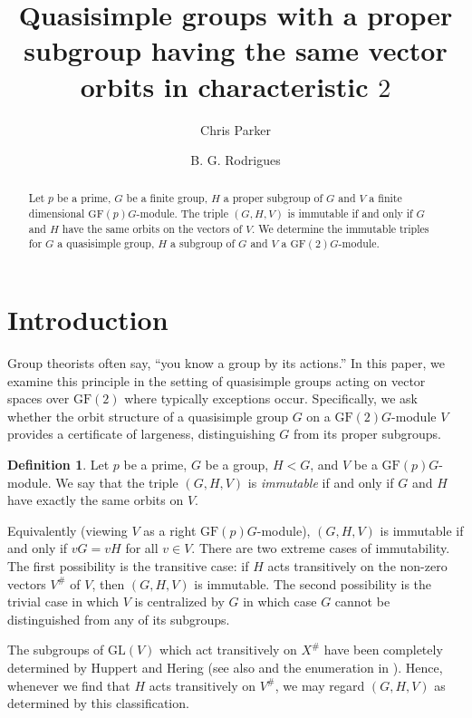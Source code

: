 \documentclass[12pt]{amsart}
\title[Quasisimple groups with a proper subgroup with the same vector orbits]
{Quasisimple groups with a proper subgroup having the same vector orbits in characteristic $2$}
\author{Chris Parker}
\author{B. G. Rodrigues}
\theoremstyle{remark}
\theoremstyle{notation}
\theoremstyle{definition}
\newtheorem{definition}[theorem]{Definition}
\newcommand{\GF}{\mathrm{GF}}
\newcommand{\GL}{\mathrm{GL}}
\newcommand{\0}{\emptyset}
\begin{document}
\maketitle

\begin{abstract}
Let  $p$ be a prime, $G$ be a finite group, $H$ a proper subgroup of $G$ and $V$ a finite dimensional $\GF(p)G$-module. The triple $(G,H,V)$ is immutable if and only if $G$ and $H$ have the same orbits on the vectors of $V$. We determine the immutable triples for $G$ a quasisimple group, $H$ a subgroup of $G$ and $V$ a $\GF(2)G$-module.
\end{abstract}

\section{Introduction}
Group theorists often say, ``you know a group by its actions.''
In this paper, we examine this principle in the setting of quasisimple groups acting on vector spaces over $\GF(2)$ where  typically exceptions occur.
Specifically, we ask whether the orbit structure of a quasisimple group $G$ on a $\GF(2)G$-module $V$ provides a certificate of largeness, distinguishing $G$ from its proper subgroups.

\begin{definition}\label{def:imm}
Let $p$ be a prime,  $ G $ be a group, $ H <G $, and $ V $ be a $ \GF(p)G $-module.
We say that the triple $ (G,H,V) $ is \emph{immutable} if and only if $ G $ and $ H $ have exactly the same orbits on $ V $.
\end{definition}

Equivalently (viewing $V$ as a right $ \GF(p)G $-module), $ (G,H,V) $ is immutable if and only if $ vG = vH $ for all $ v \in V $.  There are two extreme cases of immutability. The first possibility is the transitive case: if $ H $ acts transitively on the non-zero vectors $V ^\# $ of $V$, then $ (G,H,V) $ is immutable. The second possibility  is the trivial case in which $ V $ is centralized by $ G $ in which case $G$ cannot be distinguished from any of  its subgroups.


The  subgroups of $\GL(V)$ which act transitively on $X^\#$ have been completely determined by Huppert and Hering \cite{Huppert, Hering} (see also \cite[Section~7]{HBIII} and the enumeration in \cite[Appendix~1]{LiebeckAffine}). Hence, whenever we find that $ H $ acts transitively on $ V ^\#$, we may regard $(G,H,V)$ as determined by this classification.
\end{document}
